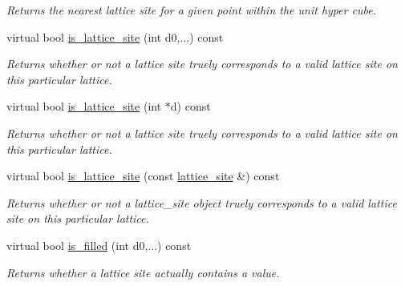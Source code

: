 \begin{DoxyCompactItemize}
\begin{DoxyCompactList}\small\item\em Returns the nearest lattice site for a given point within the unit hyper cube. \end{DoxyCompactList}\item 
\mbox{\label{classsisl_1_1cartesian__planar_ac8ac23247a744622562aa511ff385f3a}} 
virtual bool \hyperlink{classsisl_1_1cartesian__planar_ac8ac23247a744622562aa511ff385f3a}{is\+\_\+lattice\+\_\+site} (int d0,...) const
\begin{DoxyCompactList}\small\item\em Returns whether or not a lattice site truely corresponds to a valid lattice site on this particular lattice. \end{DoxyCompactList}\item 
\mbox{\label{classsisl_1_1cartesian__planar_abbd7c2c4b87293cf8eee569cf55ddb8a}} 
virtual bool \hyperlink{classsisl_1_1cartesian__planar_abbd7c2c4b87293cf8eee569cf55ddb8a}{is\+\_\+lattice\+\_\+site} (int $\ast$d) const
\begin{DoxyCompactList}\small\item\em Returns whether or not a lattice site truely corresponds to a valid lattice site on this particular lattice. \end{DoxyCompactList}\item 
\mbox{\label{classsisl_1_1cartesian__planar_a9ddeca1a05552b2a16cf7b02ca1beebd}} 
virtual bool \hyperlink{classsisl_1_1cartesian__planar_a9ddeca1a05552b2a16cf7b02ca1beebd}{is\+\_\+lattice\+\_\+site} (const \hyperlink{namespacesisl_acd18feee4026583db6185df2b25434aa}{lattice\+\_\+site} \&) const
\begin{DoxyCompactList}\small\item\em Returns whether or not a lattice\+\_\+site object truely corresponds to a valid lattice site on this particular lattice. \end{DoxyCompactList}\item 
\mbox{\label{classsisl_1_1cartesian__planar_a78b14af058713bf51eaff38e2109afee}} 
virtual bool \hyperlink{classsisl_1_1cartesian__planar_a78b14af058713bf51eaff38e2109afee}{is\+\_\+filled} (int d0,...) const
\begin{DoxyCompactList}\small\item\em Returns whether a lattice site actually contains a value. \end{DoxyCompactList}\item 

\end{DoxyCompactItemize}
